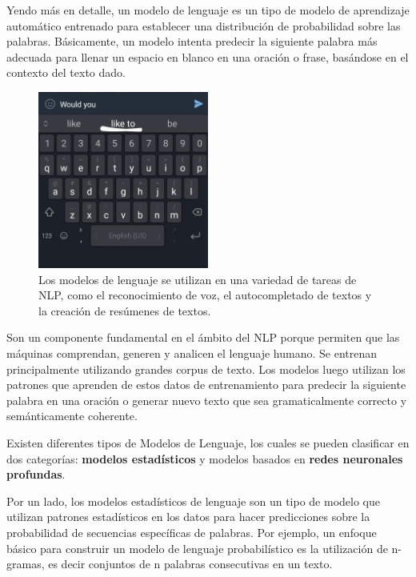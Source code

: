 Yendo más en detalle, un modelo de lenguaje es un tipo de modelo de aprendizaje automático entrenado para establecer una distribución de probabilidad sobre las palabras. Básicamente, un modelo intenta predecir la siguiente palabra más adecuada para llenar un espacio en blanco en una oración o frase, basándose en el contexto del texto dado.

\begin{figure}[H]
    \centering
    \includegraphics[width=0.5\textwidth]{imagenes/autocompletado_celular.jpg}
    \caption{Los modelos de lenguaje se utilizan en una variedad de tareas de NLP, como el reconocimiento de voz, el autocompletado de textos y la creación de resúmenes de textos.}
    \label{fig:nlp}
\end{figure}

Son un componente fundamental en el ámbito del NLP porque permiten que las máquinas comprendan, generen y analicen el lenguaje humano. Se entrenan principalmente utilizando grandes corpus de texto. Los modelos luego utilizan los patrones que aprenden de estos datos de entrenamiento para predecir la siguiente palabra en una oración o generar nuevo texto que sea gramaticalmente correcto y semánticamente coherente.

Existen diferentes tipos de Modelos de Lenguaje, los cuales se pueden clasificar en dos categorías: \textbf{modelos estadísticos} y modelos basados en \textbf{redes neuronales profundas}.

Por un lado, los modelos estadísticos de lenguaje son un tipo de modelo que utilizan patrones estadísticos en los datos para hacer predicciones sobre la probabilidad de secuencias específicas de palabras. Por ejemplo, un enfoque básico para construir un modelo de lenguaje probabilístico es la utilización de n-gramas, es decir conjuntos de n palabras consecutivas en un texto.

